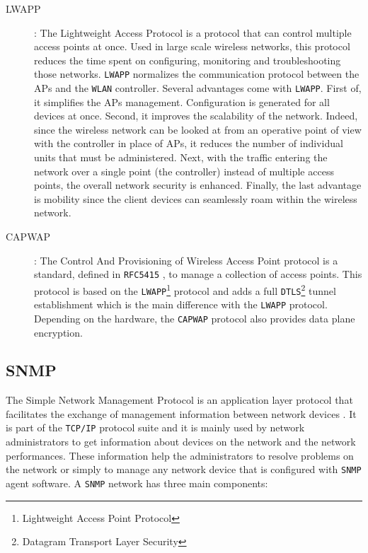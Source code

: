 \begin{description}
	\item [LWAPP]: The Lightweight Access Protocol is a protocol that can control multiple access points at once. Used in large scale wireless networks, this protocol reduces the time spent on configuring, monitoring and troubleshooting those networks. \texttt{LWAPP} normalizes the communication protocol between the APs and the \texttt{WLAN} controller. Several advantages come with \texttt{LWAPP}. First of, it simplifies the APs management. Configuration is generated for all devices at once. Second, it improves the scalability of the network. Indeed, since the wireless network can be looked at from an operative point of view with the controller in place of APs, it reduces the number of individual units that must be administered. Next, with the traffic entering the network over a single point (the controller) instead of multiple access points, the overall network security is enhanced. Finally, the last advantage is mobility since the client devices can seamlessly roam within the wireless network.


	\item [CAPWAP]: The Control And Provisioning of Wireless Access Point protocol is a standard, defined in \texttt{RFC5415} \cite{rfc5415}, to manage a collection of access points. This protocol is based on the \texttt{LWAPP}\footnote{Lightweight Access Point Protocol} protocol and adds a full \texttt{DTLS}\footnote{Datagram Transport Layer Security} tunnel establishment which is the main difference with the \texttt{LWAPP} protocol. Depending on the hardware, the \texttt{CAPWAP} protocol also provides data plane encryption.
\end{description}

\subsection{SNMP}

The Simple Network Management Protocol is an application layer protocol that facilitates the exchange of management information between network devices \cite{snmp}. It is part of the \texttt{TCP/IP} protocol suite and it is mainly used by network administrators to get information about devices on the network and the network performances. These information help the administrators to resolve problems on the network or simply to manage any network device that is configured with \texttt{SNMP} agent software. A \texttt{SNMP} network has three main components:

